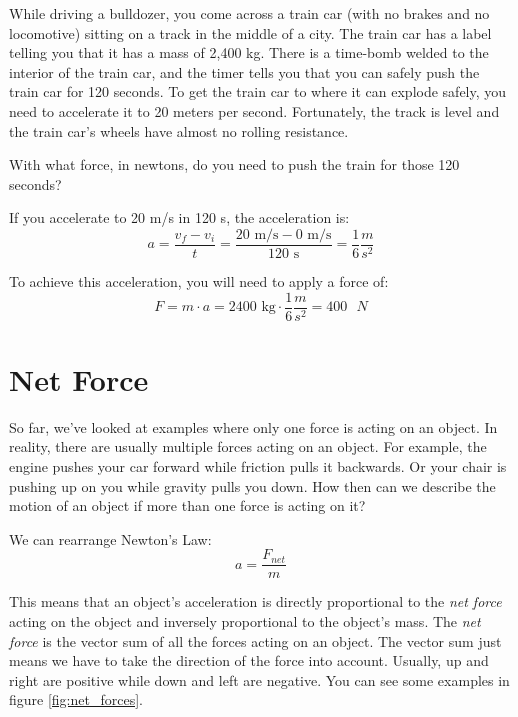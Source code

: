 \begin{Exercise}[title={Acceleration}, label=acceleration_train]

While driving a bulldozer, you come across a train car (with no brakes
and no locomotive) sitting on a track in the middle of a city. The train car
has a label telling you that it has a mass of 2,400 kg. There is a time-bomb
welded to the interior of the train car, and the timer tells you that
you can safely push the train car for 120 seconds. To get the train
car to where it can explode safely, you need to accelerate it to 20 meters per
second. Fortunately, the track is level and the train car's wheels have
almost no rolling resistance.

With what force, in newtons, do you need to push the train for those 120 seconds?

\end{Exercise}
\begin{Answer}[ref=acceleration_train]
If you accelerate to 20 m/s in 120 s, the acceleration is:
$$a = \frac{v_f - v_i}{t} = \frac{20\text{ m/s} - 0\text{ m/s}}{120\text{ s}} = 
\frac{1}{6} \frac{m}{s^2}$$

To achieve this acceleration, you will need to apply a force of:
$$F = m \cdot a = 2400\text{ kg} \cdot \frac{1}{6} \frac{m}{s^2} = 400\text{ }N$$
\end{Answer}

\section{Net Force}
So far, we've looked at examples where only one force is acting on an object. In 
reality, there are usually multiple forces acting on an object. For example, the 
engine pushes your car forward while friction pulls it backwards. Or your chair 
is pushing up on you while gravity pulls you down. How then can we describe the 
motion of an object if more than one force is acting on it?

We can rearrange Newton's Law:
$$a = \frac{F_{net}}{m}$$

This means that an object's acceleration is directly proportional to the 
\textit{net force} acting on the object and inversely proportional to the object's 
mass. The \textit{net force} is the vector sum of all the forces acting on an 
object. The vector sum just means we have to take the direction of 
the force into account. Usually, up and right are positive while down and left are 
negative. You can see some examples in figure \ref{fig:net_forces}.

